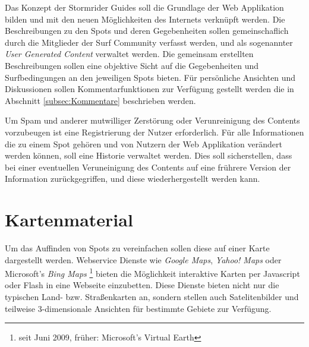 Das Konzept der Stormrider Guides soll die Grundlage der Web
Applikation bilden und mit den neuen Möglichkeiten des Internets
verknüpft werden. Die Beschreibungen zu den Spots und deren
Gegebenheiten sollen gemeinschaflich durch die Mitglieder der Surf
Community verfasst werden, und als sogenannter \textit{User Generated
  Content} verwaltet werden. Die gemeinsam erstellten Beschreibungen
sollen eine objektive Sicht auf die Gegebenheiten und Surfbedingungen
an den jeweiligen Spots bieten. Für persönliche Ansichten und
Diskussionen sollen Kommentarfunktionen zur Verfügung gestellt werden
die in Abschnitt \ref{subsec:Kommentare} beschrieben werden.

Um Spam und anderer mutwilliger Zerstörung oder Verunreinigung des
Contents vorzubeugen ist eine Registrierung der Nutzer
erforderlich. Für alle Informationen die zu einem Spot gehören und von
Nutzern der Web Applikation verändert werden können, soll eine
Historie verwaltet werden. Dies soll sicherstellen, dass bei einer
eventuellen Veruneinigung des Contents auf eine frührere Version der
Information zurückgegriffen, und diese wiederhergestellt werden kann.

\section{Kartenmaterial}

Um das Auffinden von Spots zu vereinfachen sollen diese auf einer
Karte dargestellt werden. Webservice Dienste wie \textit{Google Maps},
\textit{Yahoo! Maps} oder Microsoft's \textit{Bing Maps}
\footnote{seit Juni 2009, früher: Microsoft's Virtual Earth} bieten
die Möglichkeit interaktive Karten per Java\-script oder Flash in eine
Webseite einzubetten. Diese Dienste bieten nicht nur die typischen
Land- bzw. Straßenkarten an, sondern stellen auch Satelitenbilder und
teilweise 3-dimensionale Ansichten für bestimmte Gebiete zur
Verfügung.

